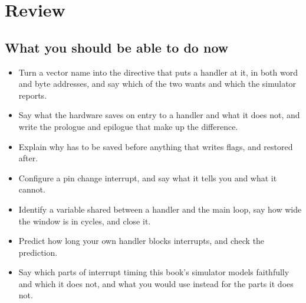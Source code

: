 
\section{Review}
\label{c3:sec:review}

\subsection*{What you should be able to do now}
\begin{itemize}
  \item Turn a vector name into the  directive that puts a handler at it, in both word
    and byte addresses, and say which of the two  wants and which the simulator
    reports.
  \item Say what the hardware saves on entry to a handler and what it does not, and write the
    prologue and epilogue that make up the difference.
  \item Explain why  has to be saved before anything that writes flags, and restored
    after.
  \item Configure a pin change interrupt, and say what it tells you and what it cannot.
  \item Identify a variable shared between a handler and the main loop, say how wide the window is
    in cycles, and close it.
  \item Predict how long your own handler blocks interrupts, and check the prediction.
  \item Say which parts of interrupt timing this book's simulator models faithfully and which it
    does not, and what you would use instead for the parts it does not.
\end{itemize}

